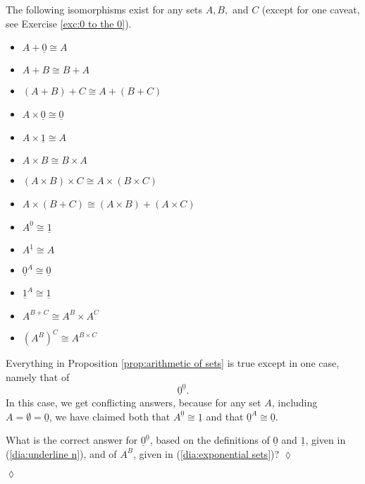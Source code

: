 \documentclass[a4paper]{book}
\def\iso{\cong}
\def\ul{\underline}
\theoremstyle{myth}
\newtheorem{propositionENG}[envENG]{\begin{english}Proposition\end{english}}
\newtheorem{excENG}[envENG]{\begin{english}Exercise\end{english}}
\newenvironment{exerciseENG}{\begin{excENG}}{\hspace*{\fill}$\lozenge$\end{excENG}}
\newtheorem{propositionRUS}[envRUS]{\begin{russian}Утверждение\end{russian}}
\newtheorem{excRUS}[envRUS]{\begin{russian}Упражнение\end{russian}}
\newenvironment{exerciseRUS}{\begin{excRUS}}{\hspace*{\fill}$\lozenge$\end{excRUS}}
\begin{document}
\begin{english}
\begin{propositionENG}\label{prop:arithmetic of sets}
The following isomorphisms exist for any sets $A,B,$ and $C$ (except for one caveat, see Exercise \ref{exc:0 to the 0}). 
\begin{russian} \end{russian}
\begin{itemize}
\item $A+\ul{0}\iso A$
\item $A + B\iso B + A$
\item $(A + B) + C \iso A + (B + C)$
\item $A\times\ul{0}\iso\ul{0}$
\item $A\times\ul{1}\iso A$
\item $A\times B\iso B\times A$
\item $(A\times B)\times C \iso A\times (B\times C)$
\item $A\times(B+C)\iso (A\times B)+(A\times C)$
\item $A^{\ul{0}}\iso \ul{1}$
\item $A^{\ul{1}}\iso A$
\item $\ul{0}^A\iso\ul{0}$
\item $\ul{1}^A\iso\ul{1}$
\item $A^{B+C}\iso A^B\times A^C$
\item $(A^B)^C\iso A^{B\times C}$
\end{itemize}
\end{propositionENG}

\begin{propositionRUS}\label{prop:arithmetic of sets}
\begin{russian} \end{russian}
\end{propositionRUS}

\begin{exerciseENG}\label{exc:0 to the 0}
Everything in Proposition \ref{prop:arithmetic of sets} is true except in one case, namely that of $$\ul{0}^{\ul{0}}.$$ In this case, we get conflicting answers, because for any set $A$, including $A=\emptyset=\ul{0}$, we have claimed both that $A^{\ul{0}}\iso\ul{1}$ and that $\ul{0}^A\iso\ul{0}.$ 

What is the correct answer for $\ul{0}^{\ul{0}}$, based on the definitions of $\ul{0}$ and $\ul{1}$, given in (\ref{dia:underline n}), and of $A^B$, given in (\ref{dia:exponential sets})?
\end{exerciseENG}

\begin{exerciseRUS}\label{exc:0 to the 0}
\begin{russian} \end{russian}
\end{exerciseRUS}


\end{english}
\end{document}

